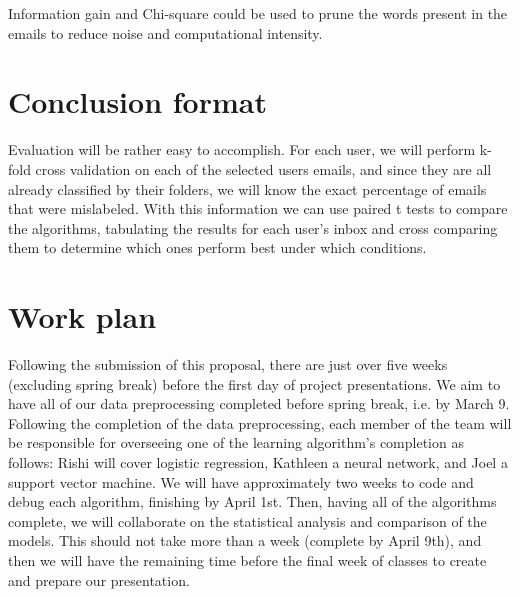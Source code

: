 \documentclass[11pt]{article}
\begin{document}
Information gain and Chi-square could be used to prune the words present in the emails to reduce noise and computational intensity.
\section{Conclusion format}
\label{sec-5}


Evaluation will be rather easy to accomplish. For each user, we will perform k-fold cross validation on each of the selected users emails, and since they are all already classified by their folders, we will know the exact percentage of emails that were mislabeled. With this information we can use paired t tests to compare the algorithms, tabulating the results for each user’s inbox and cross comparing them to determine which ones perform best under which conditions.
\section{Work plan}
\label{sec-6}


Following the submission of this proposal, there are just over five weeks (excluding spring break) before the first day of project presentations.  We aim to have all of our data preprocessing completed before spring break, i.e. by March 9.  Following the completion of the data preprocessing, each member of the team will be responsible for overseeing one of the learning algorithm's completion as follows: Rishi will cover logistic regression, Kathleen a neural network, and Joel a support vector machine.  We will have approximately two weeks to code and debug each algorithm, finishing by April 1st.  Then, having all of the algorithms complete, we will collaborate on the statistical analysis and comparison of the models.  This should not take more than a week (complete by April 9th), and then we will have the remaining time before the final week of classes to create and prepare our presentation.
\end{document}

